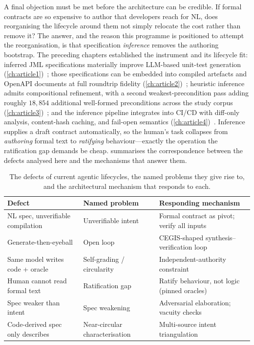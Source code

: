 A final objection must be met before the architecture can be credible. If formal contracts are so expensive to author that developers reach for NL, does reorganising the lifecycle around them not simply relocate the cost rather than remove it? The answer, and the reason this programme is positioned to attempt the reorganisation, is that specification \emph{inference} removes the authoring bootstrap. The preceding chapters established the instrument and its lifecycle fit: inferred JML specifications materially improve LLM-based unit-test generation (\cref{ch:article1})~\cite{edmonds_article1}; those specifications can be embedded into compiled artefacts and OpenAPI documents at full roundtrip fidelity (\cref{ch:article2})~\cite{edmonds_article2}; heuristic inference admits compositional refinement, with a second weakest-precondition pass adding roughly $18{,}854$ additional well-formed preconditions across the study corpus (\cref{ch:article3})~\cite{edmonds_article3}; and the inference pipeline integrates into CI/CD with diff-only analysis, content-hash caching, and fail-open semantics (\cref{ch:article4})~\cite{edmonds_article4}. Inference supplies a draft contract automatically, so the human's task collapses from \emph{authoring} formal text to \emph{ratifying} behaviour---exactly the operation the ratification gap demands be cheap.  summarises the correspondence between the defects analysed here and the mechanisms that answer them.

\begin{table}[t]
\centering
\caption{The defects of current agentic lifecycles, the named problems they give rise to, and the architectural mechanism that responds to each.}
\label{tab:a5-defect-mechanism}
\begin{tabular}{@{}lll@{}}
\toprule
Defect & Named problem & Responding mechanism \\
\midrule
NL spec, unverifiable compilation & Unverifiable intent & Formal contract as pivot; verify all inputs \\
Generate-then-eyeball & Open loop & CEGIS-shaped synthesis--verification loop \\
Same model writes code + oracle & Self-grading / circularity & Independent-authority constraint \\
Human cannot read formal text & Ratification gap & Ratify behaviour, not logic (pinned oracles) \\
Spec weaker than intent & Spec weakening & Adversarial elaboration; vacuity checks \\
Code-derived spec only describes & Near-circular characterisation & Multi-source intent triangulation \\
\bottomrule
\end{tabular}
\end{table}

